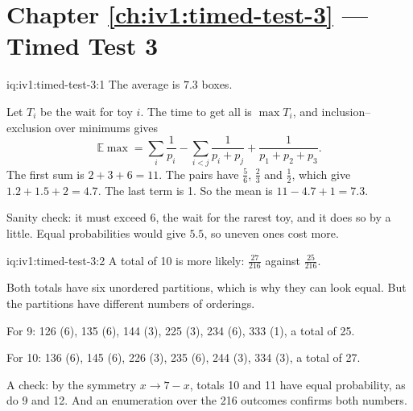\section*{Chapter \ref{ch:iv1:timed-test-3} --- Timed Test 3}

\begin{solution}{iq:iv1:timed-test-3:1}
The average is $7.3$ boxes.

Let $T_i$ be the wait for toy $i$. The time to get all is $\max T_i$, and inclusion--exclusion over minimums gives
\[
\mathbb{E}\max = \sum_i\frac{1}{p_i} - \sum_{i < j}\frac{1}{p_i + p_j} + \frac{1}{p_1 + p_2 + p_3}.
\]
The first sum is $2 + 3 + 6 = 11$. The pairs have $\frac56$, $\frac23$ and $\frac12$, which give $1.2 + 1.5 + 2 = 4.7$. The last term is 1. So the mean is $11 - 4.7 + 1 = 7.3$.

Sanity check: it must exceed 6, the wait for the rarest toy, and it does so by a little. Equal probabilities would give $5.5$, so uneven ones cost more.

\end{solution}

\begin{solution}{iq:iv1:timed-test-3:2}
A total of 10 is more likely: $\frac{27}{216}$ against $\frac{25}{216}$.

Both totals have six unordered partitions, which is why they can look equal. But the partitions have different numbers of orderings.

For 9: 126 (6), 135 (6), 144 (3), 225 (3), 234 (6), 333 (1), a total of 25.

For 10: 136 (6), 145 (6), 226 (3), 235 (6), 244 (3), 334 (3), a total of 27.

A check: by the symmetry $x \to 7 - x$, totals 10 and 11 have equal probability, as do 9 and 12. And an enumeration over the 216 outcomes confirms both numbers.

\end{solution}

